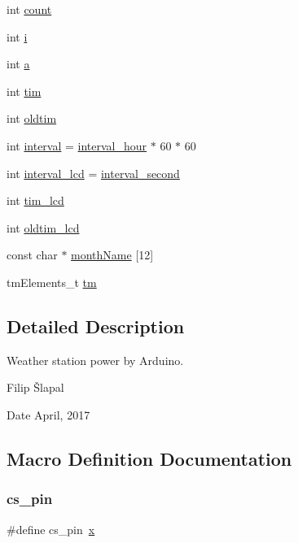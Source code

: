 \begin{DoxyCompactItemize}
int \hyperlink{_w_s_8ino_ad43c3812e6d13e0518d9f8b8f463ffcf}{count}
\item 
int \hyperlink{_w_s_8ino_acb559820d9ca11295b4500f179ef6392}{i}
\item 
int \hyperlink{_w_s_8ino_aa4c2a5552e9bc49b1816ff532f558c74}{a}
\item 
int \hyperlink{_w_s_8ino_a9ca8357cbbbe8be3c127f66bcc4082f7}{tim}
\item 
int \hyperlink{_w_s_8ino_a8455abbfc4590d0bf845dcd30505e1ce}{oldtim}
\item 
int \hyperlink{_w_s_8ino_ae0c690118932b32ef40a74bb6a259acd}{interval} = \hyperlink{_w_s_8ino_a4e07ce7aef83b2e94bd353d77029423e}{interval\+\_\+hour} $\ast$ 60 $\ast$ 60
\item 
int \hyperlink{_w_s_8ino_a64d680b4be82b34d0731c9dd84986ead}{interval\+\_\+lcd} = \hyperlink{_w_s_8ino_a0a56e85c196bfb2b3bf61abe7f007541}{interval\+\_\+second}
\item 
int \hyperlink{_w_s_8ino_aafe10273424e4ce6028423ddf348cd58}{tim\+\_\+lcd}
\item 
int \hyperlink{_w_s_8ino_a1e3b4218dc8a4352253c9648cf72433d}{oldtim\+\_\+lcd}
\item 
const char $\ast$ \hyperlink{_w_s_8ino_a9fce7af8b9842b4ab3b85327b1af13fc}{month\+Name} \mbox{[}12\mbox{]}
\item 
tm\+Elements\+\_\+t \hyperlink{_w_s_8ino_a52357cbf68af66972047f7aed7a45218}{tm}
\end{DoxyCompactItemize}


\subsection{Detailed Description}
Weather station power by Arduino. 

Filip Šlapal \begin{DoxyDate}{Date}
April, 2017 
\end{DoxyDate}


\subsection{Macro Definition Documentation}
\mbox{\label{_w_s_8ino_ad7860cb7dbe49e4f2ebde8c624b448ef}} 
\subsubsection{\texorpdfstring{cs\+\_\+pin}{cs\_pin}}
{\footnotesize\ttfamily \#define cs\+\_\+pin~\hyperlink{_w_s_8ino_ab06e9aa782b61ccfb42f7c48996f6ed4}{x}}

